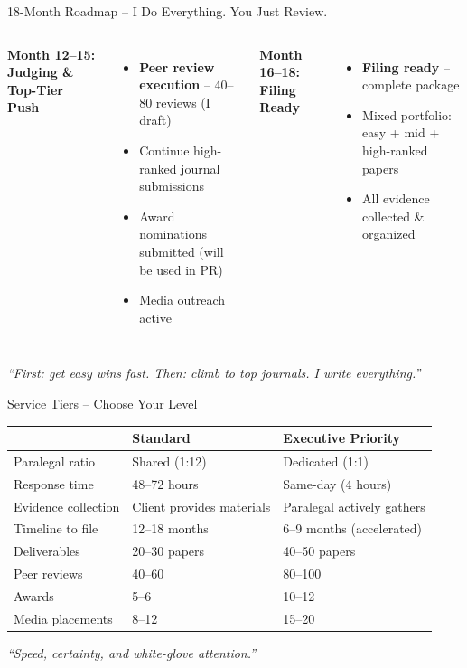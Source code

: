 \documentclass[aspectratio=169, 10pt]{beamer}
\begin{document}
\begin{frame}{18-Month Roadmap – I Do Everything. You Just Review.}
\begin{columns}[T]
			\textbf{Month 12--15: Judging \& Top-Tier Push}
			\begin{itemize}
				\item \textbf{Peer review execution} – 40–80 reviews (I draft)
				\item Continue high-ranked journal submissions
				\item Award nominations submitted (will be used in PR)
				\item Media outreach active
			\end{itemize}
			
			\textbf{Month 16--18: Filing Ready}
			\begin{itemize}
				\item \textbf{Filing ready} – complete package
				\item Mixed portfolio: easy + mid + high-ranked papers
				\item All evidence collected \& organized
			\end{itemize}
		\end{columns}
		
		\vspace{0.2cm}
		\centering
		\textcolor{accentgold}{\textit{“First: get easy wins fast. Then: climb to top journals. I write everything.”}}
	\end{frame}
	
	\begin{frame}{Service Tiers – Choose Your Level}
		\begin{table}
			\centering
			\scriptsize
			\begin{tabular}{p{2.2cm}p{2.5cm}p{2.5cm}}
				\toprule
				& \textbf{Standard} & \textbf{Executive Priority} \\
				\midrule
				Paralegal ratio & Shared (1:12) & Dedicated (1:1) \\
				Response time & 48–72 hours & Same-day (4 hours) \\
				Evidence collection & Client provides materials & Paralegal actively gathers \\
				Timeline to file & 12–18 months & 6–9 months (accelerated) \\
				Deliverables & 20–30 papers & 40–50 papers \\
				Peer reviews & 40–60 & 80–100 \\
				Awards & 5–6 & 10–12 \\
				Media placements & 8–12 & 15–20 \\
				\bottomrule
			\end{tabular}
		\end{table}
		\centering
		\vspace{0.3cm}
		\textcolor{premiumpurple}{\textit{“Speed, certainty, and white-glove attention.”}}
	\end{frame}
	
\end{document}
